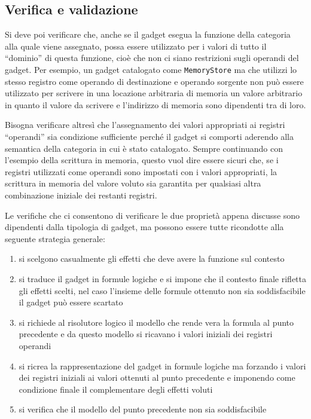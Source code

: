 \subsection{Verifica e validazione}
\label{sec:verifica_validazione}

Si deve poi verificare che, anche se il gadget esegua la funzione
della categoria alla quale viene assegnato, possa essere utilizzato
per i valori di tutto il ``dominio'' di questa funzione, cioè che non
ci siano restrizioni sugli operandi del gadget. Per esempio, un gadget
catalogato come \lstinline{MemoryStore} ma che utilizzi lo stesso
registro come operando di destinazione e operando sorgente non può
essere utilizzato per scrivere in una locazione arbitraria di memoria
un valore arbitrario in quanto il valore da scrivere e l'indirizzo di
memoria sono dipendenti tra di loro.

Bisogna verificare altresì che l'assegnamento dei valori appropriati
ai registri ``operandi'' sia condizione sufficiente perché il gadget
si comporti aderendo alla semantica della categoria in cui è stato
catalogato. Sempre continuando con l'esempio della scrittura in
memoria, questo vuol dire essere sicuri che, se i registri utilizzati
come operandi sono impostati con i valori appropriati, la scrittura in
memoria del valore voluto sia garantita per qualsiasi altra
combinazione iniziale dei restanti registri.


Le verifiche che ci consentono di verificare le due proprietà appena
discusse sono dipendenti dalla tipologia di gadget, ma possono essere
tutte ricondotte alla seguente strategia generale: 
\begin{enumerate}
\item si scelgono casualmente gli effetti che deve avere la funzione
  sul contesto
\item si traduce il gadget in formule logiche e si impone che il
  contesto finale rifletta gli effetti scelti, nel caso l'insieme
  delle formule ottenuto non sia soddisfacibile il gadget può essere
  scartato
\item si richiede al risolutore logico il modello che rende vera la
  formula al punto precedente e da questo modello si ricavano i valori
  iniziali dei registri operandi
\item si ricrea la rappresentazione del gadget in formule logiche ma
  forzando i valori dei registri iniziali ai valori ottenuti al punto
  precedente e imponendo come condizione finale il complementare degli
  effetti voluti
\item si verifica che il modello del punto precedente non sia
  soddisfacibile
\end{enumerate}

